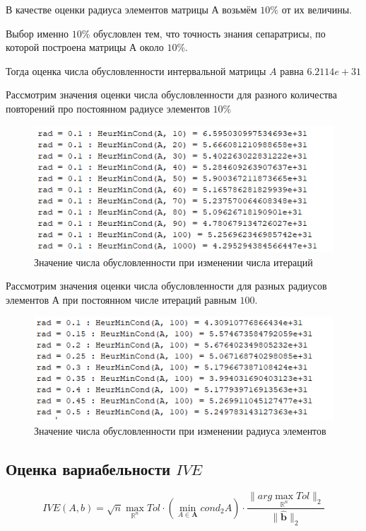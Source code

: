 \documentclass[a4]{article}
\begin{document}
В качестве оценки радиуса элементов матрицы $А$ возьмём $10\%$ от их величины.

Выбор именно $10\%$ обусловлен тем, что точность знания сепаратрисы, по которой построена матрицы $А$ около $10\%.$

Тогда оценка числа обусловленности интервальной матрицы $A$ равна $6.2114e+31$

Рассмотрим значения оценки числа обусловленности для разного количества повторений про постоянном радиусе элементов $10\%$

\begin{figure}[H]
\begin{center}
\caption{Значение числа обусловленности при изменении числа итераций}
\includegraphics{pic6.png} 
\end{center}
\end{figure}

Рассмотрим значения оценки числа обусловленности для разных радиусов элементов А при постоянном числе итераций равным $100.$

\begin{figure}[H]
\begin{center}
\caption{Значение числа обусловленности при изменении радиуса элементов}
\includegraphics{pic7.png} 
\end{center}
\end{figure}

\subsection{Оценка вариабельности $IVE$}
$$IVE(A,b)=\sqrt{n} \max\limits_{\mathbb{R}^n} Tol\cdot\left(\min\limits_{A\in\mathbf{A}}cond_2A\right)\cdot\frac{\|arg\max\limits_{\mathbb{R}^n}Tol\|_2}{\|\hat{\mathbf{b}}\|_2}$$
\end{document}
